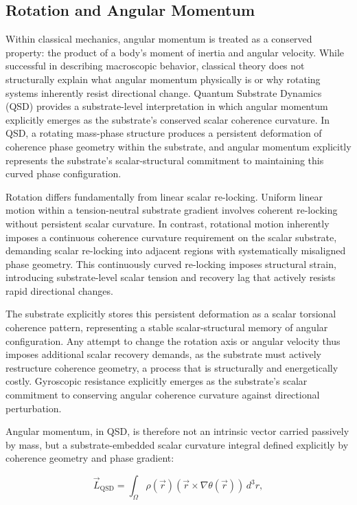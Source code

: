 \documentclass[preprints,article,submit,pdftex,moreauthors]{Definitions/mdpi}
\begin{document}
\subsection{Rotation and Angular Momentum}

Within classical mechanics, angular momentum is treated as a conserved property: the product of a body's moment of inertia and angular velocity. While successful in describing macroscopic behavior, classical theory does not structurally explain what angular momentum physically is or why rotating systems inherently resist directional change. Quantum Substrate Dynamics (QSD) provides a substrate-level interpretation in which angular momentum explicitly emerges as the substrate’s conserved scalar coherence curvature. In QSD, a rotating mass-phase structure produces a persistent deformation of coherence phase geometry within the substrate, and angular momentum explicitly represents the substrate’s scalar-structural commitment to maintaining this curved phase configuration.

Rotation differs fundamentally from linear scalar re-locking. Uniform linear motion within a tension-neutral substrate gradient involves coherent re-locking without persistent scalar curvature. In contrast, rotational motion inherently imposes a continuous coherence curvature requirement on the scalar substrate, demanding scalar re-locking into adjacent regions with systematically misaligned phase geometry. This continuously curved re-locking imposes structural strain, introducing substrate-level scalar tension and recovery lag that actively resists rapid directional changes.

The substrate explicitly stores this persistent deformation as a scalar torsional coherence pattern, representing a stable scalar-structural memory of angular configuration. Any attempt to change the rotation axis or angular velocity thus imposes additional scalar recovery demands, as the substrate must actively restructure coherence geometry, a process that is structurally and energetically costly. Gyroscopic resistance explicitly emerges as the substrate’s scalar commitment to conserving angular coherence curvature against directional perturbation.

Angular momentum, in QSD, is therefore not an intrinsic vector carried passively by mass, but a substrate-embedded scalar curvature integral defined explicitly by coherence geometry and phase gradient:

\[
\vec{L}_{\text{QSD}} = \int_{\Omega} \rho(\vec{r})\left(\vec{r}\times\nabla\theta(\vec{r})\right)\,d^3r,
\]
\end{document}
